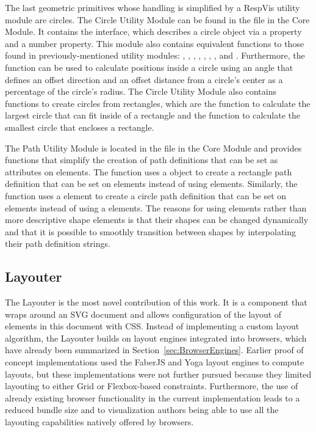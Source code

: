 The last geometric primitives whose handling is simplified by a
RespVis utility module are circles.  The Circle Utility Module can be
found in the  file in the Core Module.  It
contains the  interface, which describes a circle object
via a   property and a 
number property.  This module also contains equivalent functions to
those found in previously-mentioned utility modules:
, , ,
, , ,
, and .  Furthermore, the
 function can be used to calculate positions
inside a circle using an angle that defines an offset direction and an
offset distance from a circle's center as a percentage of the circle's
radius.  The Circle Utility Module also contains functions to create
circles from rectangles, which are the 
function to calculate the largest circle that can fit inside of a
rectangle and the  function to calculate the
smallest circle that encloses a rectangle.

The Path Utility Module is located in the 
file in the Core Module and provides functions that simplify the
creation of path definitions that can be set as  attributes on
 elements.  The  function uses a
 object to create a rectangle path definition that can be
set on  elements instead of using  elements.
Similarly, the  function uses a  element
to create a circle path definition that can be set on 
elements instead of using a  elements.  The reasons for
using  elements rather than more descriptive shape
elements is that their shapes can be changed dynamically and that it
is possible to smoothly transition between shapes by interpolating
their path definition strings.



\subsection{Layouter}
\label{sec:Layouter}

The Layouter is the most novel contribution of this work.  It is a
component that wraps around an SVG document and allows configuration
of the layout of elements in this document with CSS.  Instead of
implementing a custom layout algorithm, the Layouter builds on layout
engines integrated into browsers, which have already been summarized
in Section~\ref{sec:BrowserEngines}.  Earlier proof of concept
implementations used the FaberJS \parencite{FaberJS} and Yoga
\parencite{Yoga} layout engines to compute layouts, but these
implementations were not further pursued because they limited
layouting to either Grid or Flexbox-based constraints.  Furthermore,
the use of already existing browser functionality in the current
implementation leads to a reduced bundle size and to visualization
authors being able to use all the layouting capabilities natively
offered by browsers.

